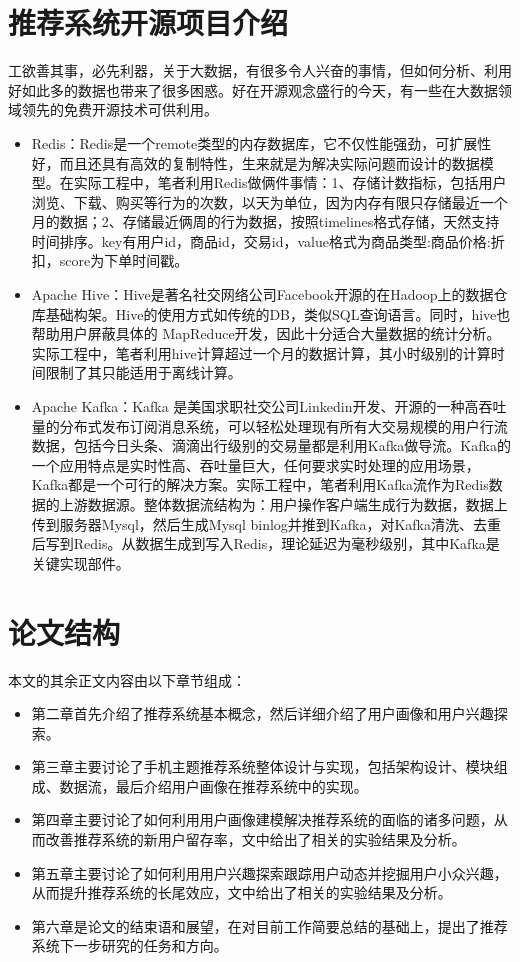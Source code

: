 \section{推荐系统开源项目介绍}
工欲善其事，必先利器，关于大数据，有很多令人兴奋的事情，但如何分析、利用好如此多的数据也带来了很多困惑。好在开源观念盛行的今天，有一些在大数据领域领先的免费开源技术可供利用。
\begin{itemize}
	\item Redis：Redis是一个remote类型的内存数据库，它不仅性能强劲，可扩展性好，而且还具有高效的复制特性，生来就是为解决实际问题而设计的数据模型。在实际工程中，笔者利用Redis做俩件事情：1、存储计数指标，包括用户浏览、下载、购买等行为的次数，以天为单位，因为内存有限只存储最近一个月的数据；2、存储最近俩周的行为数据，按照timelines格式存储，天然支持时间排序。key有用户id，商品id，交易id，value格式为商品类型:商品价格:折扣，score为下单时间戳。
	\item Apache Hive：Hive是著名社交网络公司Facebook开源的在Hadoop上的数据仓库基础构架。Hive的使用方式如传统的DB，类似SQL查询语言。同时，hive也帮助用户屏蔽具体的 MapReduce开发，因此十分适合大量数据的统计分析。实际工程中，笔者利用hive计算超过一个月的数据计算，其小时级别的计算时间限制了其只能适用于离线计算。
	\item Apache Kafka：Kafka 是美国求职社交公司Linkedin开发、开源的一种高吞吐量的分布式发布订阅消息系统，可以轻松处理现有所有大交易规模的用户行流数据，包括今日头条、滴滴出行级别的交易量都是利用Kafka做导流。Kafka的一个应用特点是实时性高、吞吐量巨大，任何要求实时处理的应用场景，Kafka都是一个可行的解决方案。实际工程中，笔者利用Kafka流作为Redis数据的上游数据源。整体数据流结构为：用户操作客户端生成行为数据，数据上传到服务器Mysql，然后生成Mysql binlog并推到Kafka，对Kafka清洗、去重后写到Redis。从数据生成到写入Redis，理论延迟为毫秒级别，其中Kafka是关键实现部件。
\end{itemize}

\section{论文结构}
	本文的其余正文内容由以下章节组成：
	\begin{itemize}
		\item 第二章首先介绍了推荐系统基本概念，然后详细介绍了用户画像和用户兴趣探索。
		\item 第三章主要讨论了手机主题推荐系统整体设计与实现，包括架构设计、模块组成、数据流，最后介绍用户画像在推荐系统中的实现。
		\item 第四章主要讨论了如何利用用户画像建模解决推荐系统的面临的诸多问题，从而改善推荐系统的新用户留存率，文中给出了相关的实验结果及分析。
		\item 第五章主要讨论了如何利用用户兴趣探索跟踪用户动态并挖掘用户小众兴趣，从而提升推荐系统的长尾效应，文中给出了相关的实验结果及分析。
		\item 第六章是论文的结束语和展望，在对目前工作简要总结的基础上，提出了推荐系统下一步研究的任务和方向。
	\end{itemize}